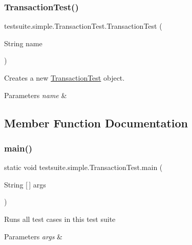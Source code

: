 \subsubsection{\texorpdfstring{Transaction\+Test()}{TransactionTest()}}
{\footnotesize\ttfamily testsuite.\+simple.\+Transaction\+Test.\+Transaction\+Test (\begin{DoxyParamCaption}\item[{String}]{name }\end{DoxyParamCaption})}

Creates a new \mbox{\hyperlink{classtestsuite_1_1simple_1_1_transaction_test}{Transaction\+Test}} object.


\begin{DoxyParams}{Parameters}
{\em name} & \\
\hline
\end{DoxyParams}


\subsection{Member Function Documentation}
\mbox{\label{classtestsuite_1_1simple_1_1_transaction_test_a64f59050254d996e0009d60f8cfed9ae}} 
\subsubsection{\texorpdfstring{main()}{main()}}
{\footnotesize\ttfamily static void testsuite.\+simple.\+Transaction\+Test.\+main (\begin{DoxyParamCaption}\item[{String \mbox{[}$\,$\mbox{]}}]{args }\end{DoxyParamCaption})\hspace{0.3cm}{\ttfamily [static]}}

Runs all test cases in this test suite


\begin{DoxyParams}{Parameters}
{\em args} & \\
\hline
\end{DoxyParams}
\mbox{\label{classtestsuite_1_1simple_1_1_transaction_test_a28bb243468ffb003fc134f48ff74a740}} 

